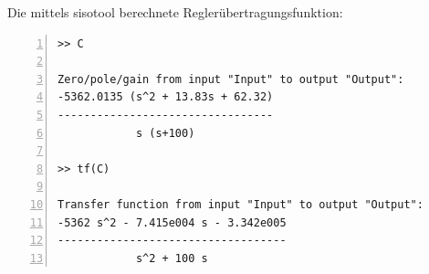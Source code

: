 \documentclass[a4paper,10pt,left=1.5cm,right=1.5cm,top=1.5cm,bottom=1.5cm]{article}
\begin{document}
Die mittels sisotool berechnete Reglerübertragungsfunktion:

\begin{lstlisting}[numbers=left]
>> C
 
Zero/pole/gain from input "Input" to output "Output":
-5362.0135 (s^2 + 13.83s + 62.32)
---------------------------------
            s (s+100)
 
>> tf(C)
 
Transfer function from input "Input" to output "Output":
-5362 s^2 - 7.415e004 s - 3.342e005
-----------------------------------
            s^2 + 100 s
\end{lstlisting}
\end{document}
